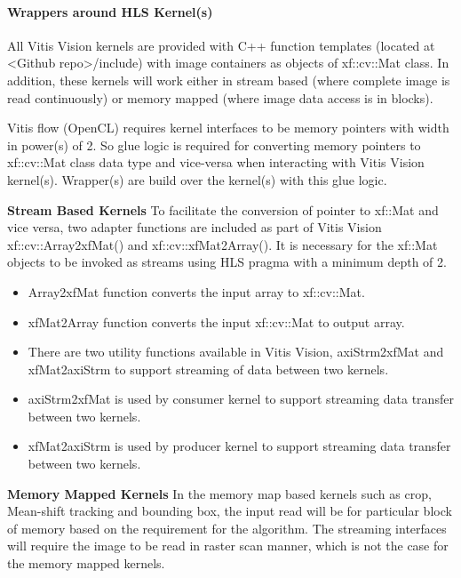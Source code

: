 \paragraph{Wrappers around HLS Kernel(s)}
All Vitis Vision kernels are provided with C++ function templates (located at <Github repo>/include) with image containers as objects of xf::cv::Mat class. In addition, these kernels will work either in stream based (where complete image is read continuously) or memory mapped (where image data access is in blocks).

\par Vitis flow (OpenCL) requires kernel interfaces to be memory pointers with width in power(s) of 2. So glue logic is required for converting memory pointers to xf::cv::Mat class data type and vice-versa when interacting with Vitis Vision kernel(s). Wrapper(s) are build over the kernel(s) with this glue logic. 

\par \textbf{Stream Based Kernels}
To facilitate the conversion of pointer to xf::Mat and vice versa, two adapter functions are included as part of Vitis Vision xf::cv::Array2xfMat() and xf::cv::xfMat2Array(). It is necessary for the xf::Mat objects to be invoked as streams using HLS pragma with a minimum depth of 2. 

\begin{itemize}
  \item Array2xfMat function converts the input array to xf::cv::Mat.
  \item xfMat2Array function converts the input xf::cv::Mat to output array.
  \item There are two utility functions available in Vitis Vision, axiStrm2xfMat and xfMat2axiStrm to support streaming of data between two kernels.
  \item axiStrm2xfMat is used by consumer kernel to support streaming data transfer between two kernels.
  \item xfMat2axiStrm is used by producer kernel to support streaming data transfer between two kernels.
\end{itemize}

\par \textbf{Memory Mapped Kernels} In the memory map based kernels such as crop, Mean-shift tracking and bounding box, the input read will be for particular block of memory based on the requirement for the algorithm. The streaming interfaces will require the image to be read in raster scan manner, which is not the case for the memory mapped kernels.


